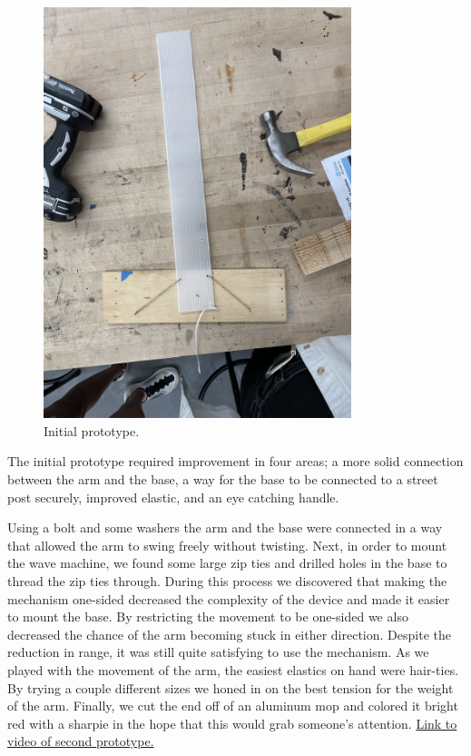 \documentclass[11pt]{report}
\begin{document}
\begin{figure}[ht!]
\centering
\includegraphics[width=0.8\textwidth, angle=-90]{"images/II/prototype_1.JPG"}
\caption{Initial prototype.}
\end{figure}

The initial prototype required improvement in four areas; a more solid connection between the arm and the base, a way for the base to be connected to a street post securely, improved elastic, and an eye catching handle.

Using a bolt and some washers the arm and the base were connected in a way that allowed the arm to swing freely without twisting. Next, in order to mount the wave machine, we found some large zip ties and drilled holes in the base to thread the zip ties through. During this process we discovered that making the mechanism one-sided decreased the complexity of the device and made it easier to mount the base. By restricting the movement to be one-sided we also decreased the chance of the arm becoming stuck in either direction. Despite the reduction in range, it was still quite satisfying to use the mechanism. As we played with the movement of the arm, the easiest elastics on hand were hair-ties. By trying a couple different sizes we honed in on the best tension for the weight of the arm. Finally, we cut the end off of an aluminum mop and colored it bright red with a sharpie in the hope that this would grab someone's attention. \href{https://drive.google.com/file/d/10h-Otp0xxu8sbUBII9ftw7f-XZoaok2H/view?usp=sharing}{Link to video of second prototype.}
\end{document}
